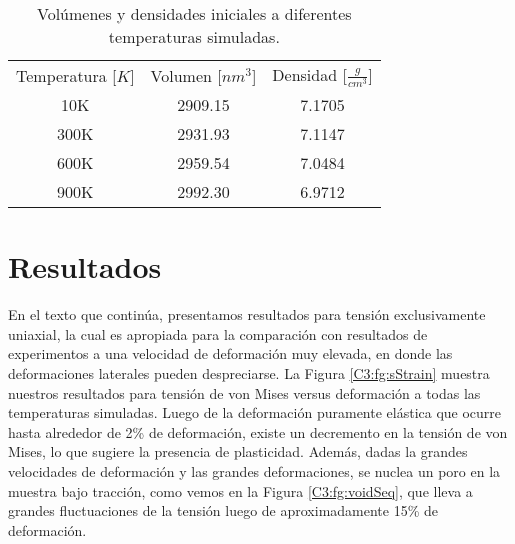 \begin{table}[htp]
\caption[Volúmenes y densidades iniciales.]{Volúmenes y densidades iniciales a diferentes temperaturas simuladas.}
\begin{center}
\begin{tabular}{*{3}{c}}
Temperatura [$K$] & Volumen [$nm^{3}$] & Densidad [$\frac{g}{cm^{3}}]$ \\
10K & 2909.15 & 7.1705 \\
300K & 2931.93 & 7.1147 \\
600K & 2959.54 & 7.0484 \\
900K & 2992.30 & 6.9712
\end{tabular}
\end{center}
\label{C3:tb:initprops}
\end{table}

\section{Resultados}

En el texto que continúa, presentamos resultados para tensión exclusivamente uniaxial, la cual es apropiada para la comparación con resultados de experimentos a una velocidad de deformación muy elevada, en donde las deformaciones laterales pueden despreciarse. La Figura \ref{C3:fg:sStrain}  muestra nuestros resultados para tensión de von Mises versus deformación a todas las temperaturas simuladas. Luego de la deformación puramente elástica que ocurre hasta alrededor de 2\% de deformación, existe un decremento en la tensión de von Mises, lo que sugiere la presencia de plasticidad. Además, dadas la grandes velocidades de deformación y las grandes deformaciones, se nuclea un poro en la muestra bajo tracción, como vemos en la Figura \ref{C3:fg:voidSeq}, que lleva a grandes fluctuaciones de la tensión luego de aproximadamente 15\% de deformación.


